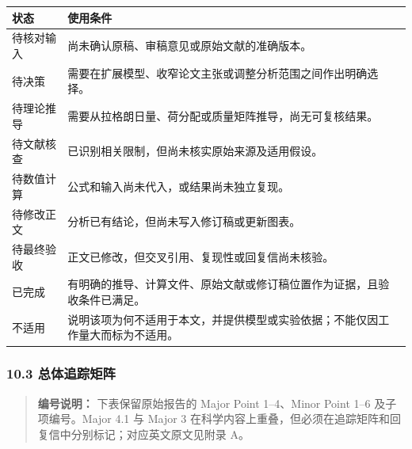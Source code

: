 \documentclass[
  chinese,
  UTF8]{ctexart}
\newcounter{none} %
\begin{document}
{\def\LTcaptype{none} %
\begin{longtable}[]{@{}
  >{\raggedright\arraybackslash}p{}
  >{\raggedright\arraybackslash}p{}@{}}
\toprule\noalign{}
\begin{minipage}[b]{\linewidth}\raggedright
状态
\end{minipage} & \begin{minipage}[b]{\linewidth}\raggedright
使用条件
\end{minipage} \\
\midrule\noalign{}
\endhead
\bottomrule\noalign{}
\endlastfoot
待核对输入 & 尚未确认原稿、审稿意见或原始文献的准确版本。 \\
待决策 & 需要在扩展模型、收窄论文主张或调整分析范围之间作出明确选择。 \\
待理论推导 & 需要从拉格朗日量、荷分配或质量矩阵推导，尚无可复核结果。 \\
待文献核查 & 已识别相关限制，但尚未核实原始来源及适用假设。 \\
待数值计算 & 公式和输入尚未代入，或结果尚未独立复现。 \\
待修改正文 & 分析已有结论，但尚未写入修订稿或更新图表。 \\
待最终验收 & 正文已修改，但交叉引用、复现性或回复信尚未核验。 \\
已完成 &
有明确的推导、计算文件、原始文献或修订稿位置作为证据，且验收条件已满足。 \\
不适用 &
说明该项为何不适用于本文，并提供模型或实验依据；不能仅因工作量大而标为不适用。 \\
\end{longtable}
}

\subsubsection{10.3
总体追踪矩阵}\label{ux603bux4f53ux8ffdux8e2aux77e9ux9635}

\begin{quote}
\textbf{编号说明：} 下表保留原始报告的 Major Point 1--4、Minor Point
1--6 及子项编号。Major 4.1 与 Major 3
在科学内容上重叠，但必须在追踪矩阵和回复信中分别标记；对应英文原文见附录
A。
\end{quote}
\end{document}
